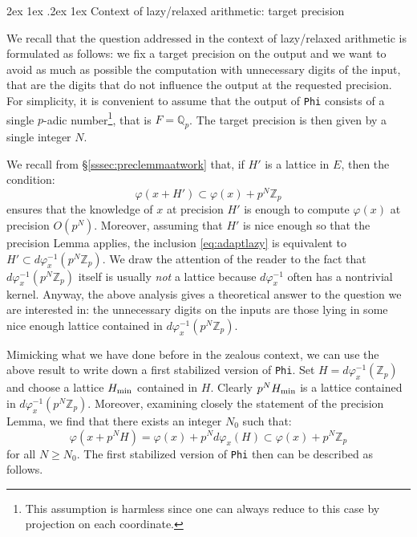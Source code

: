 \documentclass[11pt]{article}
\makeatletter
\numberwithin{equation}{section}
\numberwithin{figure}{section}
\renewcommand\paragraph{\@startsection{paragraph}{4}{\z@}%
                                    {2ex \@plus1ex \@minus.2ex}%
                                    {1ex}%
                                    {\normalfont\normalsize\bfseries}}
\renewcommand{\geq}{\geqslant}
\theoremstyle{definition}
\newcommand{\Z}{\mathbb Z}
\newcommand{\Zp}{\Z_p}
\newcommand{\Q}{\mathbb Q}
\newcommand{\Qp}{\Q_p}
\renewcommand{\min}{\text{\rm min}}
\makeatother
\begin{document}
\paragraph{Context of lazy/relaxed arithmetic: target precision}

We recall that the question addressed in the context of lazy/relaxed 
arithmetic is formulated as follows: we fix a target precision on the 
output and we want to avoid as much as possible the computation with
unnecessary digits of the 
input, that are the digits that do not influence the output at the 
requested precision. For simplicity, it is convenient to assume that the 
output of \texttt{Phi} consists of a single $p$-adic 
number\footnote{This assumption is harmless since one can always reduce 
to this case by projection on each coordinate.}, that is $F = \Qp$. The 
target precision is then given by a single integer $N$.

We recall from \S \ref{sssec:preclemmaatwork} that, if $H'$ is a lattice 
in $E$, then the condition:
\begin{equation}
\label{eq:adaptlazy}
\varphi(x+H') \subset \varphi(x) + p^N \Zp
\end{equation}
ensures that the knowledge of $x$ at precision $H'$ is enough to compute 
$\varphi(x)$ at precision $O(p^N)$. 
Moreover, assuming that $H'$ is nice enough so that the precision Lemma 
applies, the inclusion \eqref{eq:adaptlazy} is equivalent to $H' \subset 
d \varphi_x^{-1}(p^N \Zp)$. We draw the attention of the reader to the
fact that $d \varphi_x^{-1}(p^N \Zp)$ itself is usually \emph{not} a 
lattice because $d \varphi_x^{-1}$ often has a nontrivial kernel.
Anyway, 
the above analysis gives a theoretical answer to the question we are 
interested in: the unnecessary digits on the inputs are those lying in 
some nice enough lattice contained in $d\varphi_x^{-1}(p^N \Zp)$.

Mimicking what we have done before in the zealous context, we can use the 
above result to write down a first stabilized version of \texttt{Phi}. 
Set $H = d\varphi_x^{-1} (\Zp)$ and choose a lattice $H_\min$ contained 
in $H$. Clearly $p^N H_\min$ is a lattice contained in $d\varphi_x^{-1} 
(p^N \Zp)$. Moreover, examining closely the statement of the precision 
Lemma, we find that there exists an integer $N_0$ such that:
\begin{equation}
\label{eq:adaptlazyv1}
\varphi(x + p^N H) = \varphi(x) + p^N d \varphi_x(H) \subset
\varphi(x) + p^N \Zp
\end{equation}
for all $N \geq N_0$. The first stabilized version of \texttt{Phi}
then can be described as follows.
\end{document}
